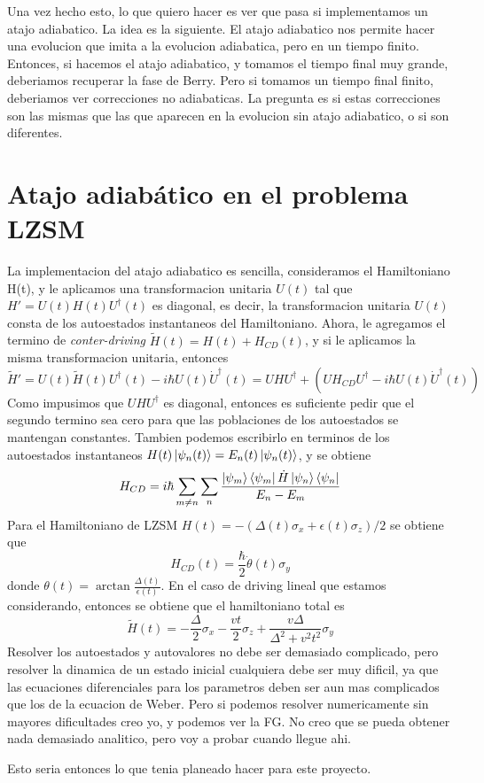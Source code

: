 Una vez hecho esto, lo que quiero hacer es ver que pasa si implementamos un atajo adiabatico. La idea es la siguiente. El atajo adiabatico nos permite hacer una evolucion que imita a la evolucion adiabatica, pero en un tiempo finito. Entonces, si hacemos el atajo adiabatico, y tomamos el tiempo final muy grande, deberiamos recuperar la fase de Berry. Pero si tomamos un tiempo final finito, deberiamos ver correcciones no adiabaticas. La pregunta es si estas correcciones son las mismas que las que aparecen en la evolucion sin atajo adiabatico, o si son diferentes. 

\section{Atajo adiabático en el problema LZSM}
La implementacion del atajo adiabatico es sencilla, consideramos el Hamiltoniano H(t), y le aplicamos una transformacion unitaria $U(t)$ tal que $H' = U(t) H(t) U^\dagger(t)$ es diagonal, es decir, la transformacion unitaria $U(t)$ consta de los autoestados instantaneos del Hamiltoniano.
Ahora, le agregamos el termino de \textit{conter-driving} $\tilde H(t) = H(t)+ H_{CD}(t)$, y si le aplicamos la misma transformacion unitaria, entonces
\begin{equation}
    \tilde H' = U(t) \tilde H(t) U^\dagger(t) - i\hbar  U(t) \dot U^\dagger(t) = UHU^\dagger+\left(UH_{CD}U^\dagger - i\hbar  U(t) \dot U^\dagger(t)\right)
\end{equation}
Como impusimos que $UHU^\dagger$ es diagonal, entonces es suficiente pedir que el segundo termino sea cero para que las poblaciones de los autoestados se mantengan constantes. 
Tambien podemos escribirlo en terminos de los autoestados instantaneos $H(t)\ket{\psi_n(t)}=E_n(t)\ket{\psi_n(t)}$, y se obtiene
\begin{equation}
    H_{CD} = i \hbar \sum_{m\neq n }\sum_n \dfrac{\ket{\psi_m}\bra{\psi_m} \dot H \ket{\psi_n}\bra{\psi_n}}{E_n-E_m}
\end{equation}
Para el Hamiltoniano de LZSM $H(t)=-(\Delta(t)\sigma_x+\epsilon(t)\sigma_z)/2$ se obtiene que 
\begin{equation}
    H_{CD}(t)=\frac{\hbar}{2}\dot\theta(t)\sigma_y
\end{equation}
donde $\theta(t)=\arctan\frac{\Delta(t)}{\epsilon(t)}$. En el caso de driving lineal que estamos considerando, entonces se obtiene que el hamiltoniano total es 
\begin{equation}
    \tilde H(t)=-\frac{\Delta}{2}\sigma_x-\frac{vt}{2}\sigma_z+\frac{v\Delta}{\Delta^2+v^2t^2}\sigma_y
\end{equation}
Resolver los autoestados y autovalores no debe ser demasiado complicado, pero resolver la dinamica de un estado inicial cualquiera debe ser muy dificil, ya que las ecuaciones diferenciales para los parametros deben ser aun mas complicados que los de la ecuacion de Weber. Pero si podemos resolver numericamente sin mayores dificultades creo yo, y podemos ver la FG. No creo que se pueda obtener nada demasiado analitico, pero voy a probar cuando llegue ahi. 

Esto seria entonces lo que tenia planeado hacer para este proyecto.

